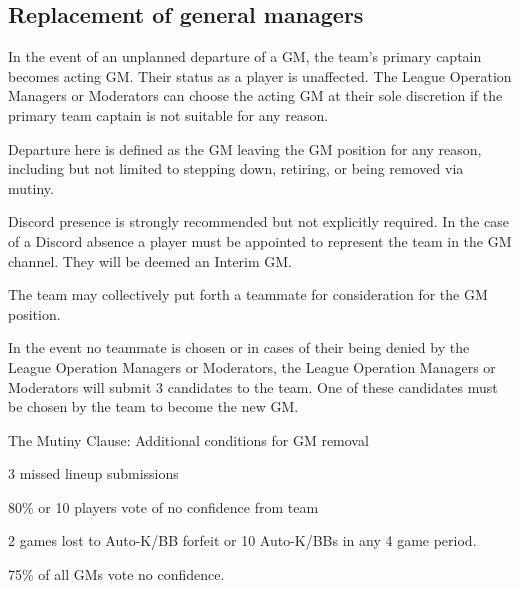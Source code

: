 \subsection{Replacement of general managers}
\begin{deepEnumerate}
	\item In the event of an unplanned departure of a GM, the team's primary captain becomes acting GM.	Their status as a player is unaffected.
	The League Operation Managers or Moderators can choose the acting GM at their sole discretion if the primary team captain is not suitable for any reason.
	\begin{deepEnumerate}
		\item Departure here is defined as the GM leaving the GM position for any reason, including but not limited to stepping down, retiring, or being removed via mutiny.
		\begin{deepEnumerate}
			\item Discord presence is strongly recommended but not explicitly required.	In the case of a Discord absence a player must be appointed
			to represent the team in the GM channel. They will be deemed an Interim GM.
		\end{deepEnumerate}
	\end{deepEnumerate}
	\item The team may collectively put forth a teammate for consideration for the GM position.
	\item In the event no teammate is chosen or in cases of their being denied by the League Operation Managers or Moderators,
	the League Operation Managers or Moderators will submit 3 candidates to the team. One of these candidates must be chosen by the team to become the new GM.
	\item The Mutiny Clause: Additional conditions for GM removal
	\begin{deepEnumerate}
		\item 3 missed lineup submissions
		\item 80\% or 10 players vote of no confidence from team
		\item 2 games lost to Auto-K/BB forfeit or 10 Auto-K/BBs in any 4 game period.
		\item 75\% of all GMs vote no confidence.
	\end{deepEnumerate}
\end{deepEnumerate}

